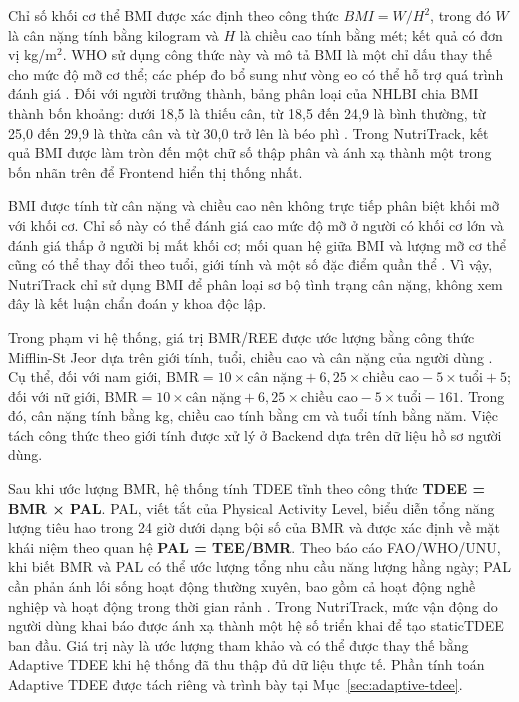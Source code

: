 \documentclass[12pt, a4paper]{report}
\begin{document}
Chỉ số khối cơ thể BMI được xác định theo công thức
\(
BMI = W/H^2
\),
trong đó \(W\) là cân nặng tính bằng kilogram và \(H\) là chiều cao tính bằng mét; kết quả có đơn vị kg/m\(^2\). WHO sử dụng công thức này và mô tả BMI là một chỉ dấu thay thế cho mức độ mỡ cơ thể; các phép đo bổ sung như vòng eo có thể hỗ trợ quá trình đánh giá \cite{whoObesityOverweight2025}. Đối với người trưởng thành, bảng phân loại của NHLBI chia BMI thành bốn khoảng: dưới 18,5 là thiếu cân, từ 18,5 đến 24,9 là bình thường, từ 25,0 đến 29,9 là thừa cân và từ 30,0 trở lên là béo phì \cite{nhlbiPracticalGuide2000}. Trong NutriTrack, kết quả BMI được làm tròn đến một chữ số thập phân và ánh xạ thành một trong bốn nhãn trên để Frontend hiển thị thống nhất.

BMI được tính từ cân nặng và chiều cao nên không trực tiếp phân biệt khối mỡ với khối cơ. Chỉ số này có thể đánh giá cao mức độ mỡ ở người có khối cơ lớn và đánh giá thấp ở người bị mất khối cơ; mối quan hệ giữa BMI và lượng mỡ cơ thể cũng có thể thay đổi theo tuổi, giới tính và một số đặc điểm quần thể \cite{nhlbiPracticalGuide2000}. Vì vậy, NutriTrack chỉ sử dụng BMI để phân loại sơ bộ tình trạng cân nặng, không xem đây là kết luận chẩn đoán y khoa độc lập.

Trong phạm vi hệ thống, giá trị BMR/REE được ước lượng bằng công thức Mifflin-St Jeor dựa trên giới tính, tuổi, chiều cao và cân nặng của người dùng \cite{mifflin1990}. Cụ thể, đối với nam giới, $\text{BMR} = 10 \times \text{cân nặng} + 6,25 \times \text{chiều cao} - 5 \times \text{tuổi} + 5$; đối với nữ giới, $\text{BMR} = 10 \times \text{cân nặng} + 6,25 \times \text{chiều cao} - 5 \times \text{tuổi} - 161$. Trong đó, cân nặng tính bằng kg, chiều cao tính bằng cm và tuổi tính bằng năm. Việc tách công thức theo giới tính được xử lý ở Backend dựa trên dữ liệu hồ sơ người dùng.

Sau khi ước lượng BMR, hệ thống tính TDEE tĩnh theo công thức \textbf{TDEE = BMR × PAL}. PAL, viết tắt của Physical Activity Level, biểu diễn tổng năng lượng tiêu hao trong 24 giờ dưới dạng bội số của BMR và được xác định về mặt khái niệm theo quan hệ \textbf{PAL = TEE/BMR}. Theo báo cáo FAO/WHO/UNU, khi biết BMR và PAL có thể ước lượng tổng nhu cầu năng lượng hằng ngày; PAL cần phản ánh lối sống hoạt động thường xuyên, bao gồm cả hoạt động nghề nghiệp và hoạt động trong thời gian rảnh \cite{fao_who_unu_2001}. Trong NutriTrack, mức vận động do người dùng khai báo được ánh xạ thành một hệ số triển khai để tạo staticTDEE ban đầu. Giá trị này là ước lượng tham khảo và có thể được thay thế bằng Adaptive TDEE khi hệ thống đã thu thập đủ dữ liệu thực tế. Phần tính toán Adaptive TDEE được tách riêng và trình bày tại Mục~\ref{sec:adaptive-tdee}.
\end{document}
